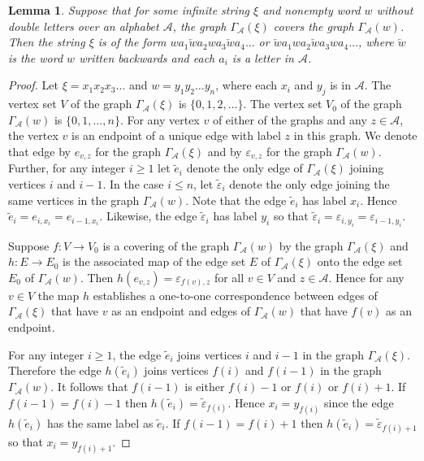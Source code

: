 \documentclass[12pt]{article}
\newtheorem{lemma}[theorem]{Lemma}
\theoremstyle{definition}
\def\cA{\mathcal{A}}
\def\eps{\varepsilon}
\begin{document}
\begin{lemma}\label{half-line-covers}
Suppose that for some infinite string $\xi$ and nonempty word $w$ without 
double letters over an alphabet $\cA$, the graph $\Gamma_{\cA}(\xi)$ covers 
the graph $\Gamma_{\cA}(w)$.  Then the string $\xi$ is of the form 
$wa_1\overleftarrow{w}a_2wa_3\overleftarrow{w}a_4\ldots$ or 
$\overleftarrow{w}a_1wa_2\overleftarrow{w}a_3wa_4\ldots$, where 
$\overleftarrow{w}$ is the word $w$ written backwards and each $a_i$ is a 
letter in $\cA$.
\end{lemma}

\begin{proof}
Let $\xi=x_1x_2x_3\ldots$ and $w=y_1y_2\ldots y_n$, where each $x_i$ and 
$y_j$ is in $\cA$.  The vertex set $V$ of the graph $\Gamma_{\cA}(\xi)$ is 
$\{0,1,2,\dots\}$.  The vertex set $V_0$ of the graph $\Gamma_{\cA}(w)$ is 
$\{0,1,\dots,n\}$.  For any vertex $v$ of either of the graphs and any 
$z\in\cA$, the vertex $v$ is an endpoint of a unique edge with label $z$ in 
this graph.  We denote that edge by $e_{v,z}$ for the graph 
$\Gamma_{\cA}(\xi)$ and by $\eps_{v,z}$ for the graph $\Gamma_{\cA}(w)$.  
Further, for any integer $i\ge1$ let $\tilde e_i$ denote the only edge of 
$\Gamma_{\cA}(\xi)$ joining vertices $i$ and $i-1$.  In the case $i\le n$, 
let $\tilde\eps_i$ denote the only edge joining the same vertices in the 
graph $\Gamma_{\cA}(w)$.  Note that the edge $\tilde e_i$ has label $x_i$.  
Hence $\tilde e_i=e_{i,x_i}=e_{i-1,x_i}$.  Likewise, the edge 
$\tilde\eps_i$ has label $y_i$ so that 
$\tilde\eps_i=\eps_{i,y_i}=\eps_{i-1,y_i}$.

Suppose $f:V\to V_0$ is a covering of the graph $\Gamma_{\cA}(w)$ by the 
graph $\Gamma_{\cA}(\xi)$ and $h:E\to E_0$ is the associated map of the 
edge set $E$ of $\Gamma_{\cA}(\xi)$ onto the edge set $E_0$ of 
$\Gamma_{\cA}(w)$.  Then $h(e_{v,z})=\eps_{f(v),z}$ for all $v\in V$ and 
$z\in\cA$.  Hence for any $v\in V$ the map $h$ establishes a one-to-one 
correspondence between edges of $\Gamma_{\cA}(\xi)$ that have $v$ as an 
endpoint and edges of $\Gamma_{\cA}(w)$ that have $f(v)$ as an endpoint.

For any integer $i\ge1$, the edge $\tilde e_i$ joins vertices $i$ and $i-1$ 
in the graph $\Gamma_{\cA}(\xi)$.  Therefore the edge $h(\tilde e_i)$ joins 
vertices $f(i)$ and $f(i-1)$ in the graph $\Gamma_{\cA}(w)$.  It follows 
that $f(i-1)$ is either $f(i)-1$ or $f(i)$ or $f(i)+1$.  If $f(i-1)=f(i)-1$ 
then $h(\tilde e_i)=\tilde\eps_{f(i)}$.  Hence $x_i=y_{f(i)}$ since the 
edge $h(\tilde e_i)$ has the same label as $\tilde e_i$.  If 
$f(i-1)=f(i)+1$ then $h(\tilde e_i)=\tilde\eps_{f(i)+1}$ so that 
$x_i=y_{f(i)+1}$.


\end{proof}
\end{document}
